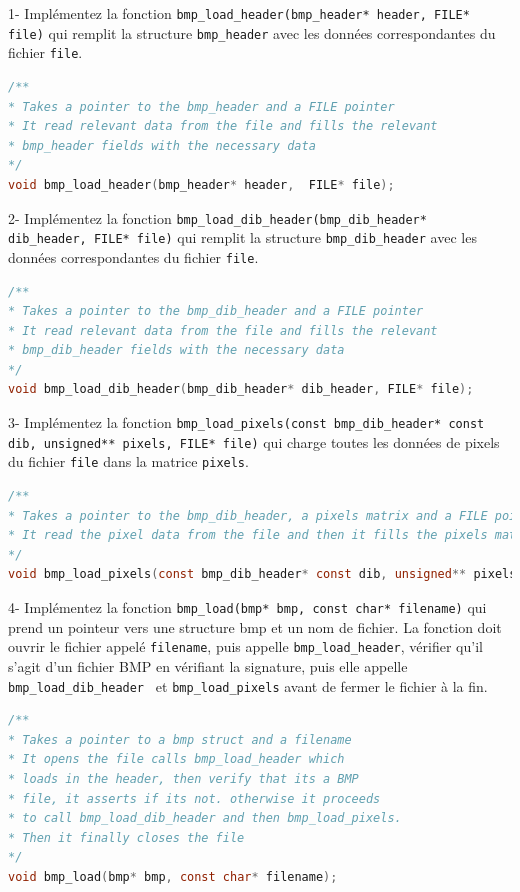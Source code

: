 \documentclass[a4paper]{article}
\begin{document}
	1- Implémentez la fonction \texttt{bmp\_load\_header(bmp\_header* header, FILE* file)} qui remplit la structure \texttt{bmp\_header} avec les données correspondantes du fichier \texttt{file}.
	\begin{lstlisting}[language=C]
/**
* Takes a pointer to the bmp_header and a FILE pointer
* It read relevant data from the file and fills the relevant
* bmp_header fields with the necessary data
*/
void bmp_load_header(bmp_header* header,  FILE* file);
	\end{lstlisting}
	2- Implémentez la fonction \texttt{bmp\_load\_dib\_header(bmp\_dib\_header* dib\_header, FILE* file)} qui remplit la structure \texttt{bmp\_dib\_header} avec les données correspondantes du fichier \texttt{file}.
	\begin{lstlisting}[language=C]
/**
* Takes a pointer to the bmp_dib_header and a FILE pointer
* It read relevant data from the file and fills the relevant
* bmp_dib_header fields with the necessary data
*/
void bmp_load_dib_header(bmp_dib_header* dib_header, FILE* file);
	\end{lstlisting}
	3- Implémentez la fonction \texttt{bmp\_load\_pixels(const bmp\_dib\_header* const dib, unsigned** pixels, FILE* file)} qui charge toutes les données de pixels du fichier \texttt{file} dans la matrice \texttt{pixels}.
	\begin{lstlisting}[language=C]
/**
* Takes a pointer to the bmp_dib_header, a pixels matrix and a FILE pointer
* It read the pixel data from the file and then it fills the pixels matrix
*/
void bmp_load_pixels(const bmp_dib_header* const dib, unsigned** pixels, FILE* file);
	\end{lstlisting}
	4- Implémentez la fonction \texttt{bmp\_load(bmp* bmp, const char* filename)} qui prend un pointeur vers une structure bmp et un nom de fichier. La fonction doit ouvrir le fichier appelé \texttt{filename}, puis appelle \texttt{bmp\_load\_header}, vérifier qu'il s'agit d'un fichier BMP en vérifiant la signature, puis elle appelle \texttt{bmp\_load\_dib\_header } et \texttt{bmp\_load\_pixels} avant de fermer le fichier à la fin.\\
	\begin{lstlisting}[language=C]
/**
* Takes a pointer to a bmp struct and a filename
* It opens the file calls bmp_load_header which 
* loads in the header, then verify that its a BMP 
* file, it asserts if its not. otherwise it proceeds
* to call bmp_load_dib_header and then bmp_load_pixels.
* Then it finally closes the file
*/
void bmp_load(bmp* bmp, const char* filename);
	\end{lstlisting}
\end{document}

